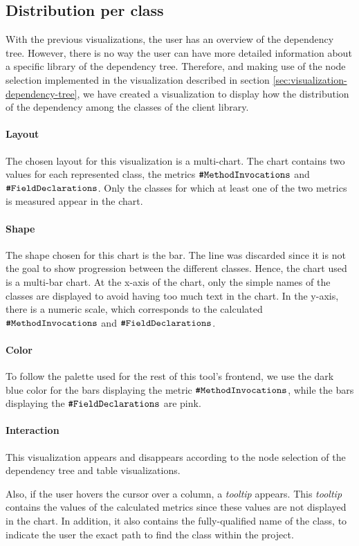 \subsection{Distribution per class}
With the previous visualizations, the user has an overview of the dependency tree. However, there is no way the user can have more detailed information about a specific library of the dependency tree. Therefore, and making use of the node selection implemented in the visualization described in section \ref{sec:visualization-dependency-tree}, we have created a visualization to display how the distribution of the dependency among the classes of the client library.

\paragraph{Layout}
The chosen layout for this visualization is a multi-chart. The chart contains two values for each represented class, the metrics \(\verb|#MethodInvocations|\) and \(\verb|#FieldDeclarations|\).
Only the classes for which at least one of the two metrics is measured appear in the chart.

\paragraph{Shape}
The shape chosen for this chart is the bar. The line was discarded since it is not the goal to show progression between the different classes. Hence, the chart used is a multi-bar chart.
At the x-axis of the chart, only the simple names of the classes are displayed to avoid having too much text in the chart. In the y-axis, there is a numeric scale, which corresponds to the calculated \(\verb|#MethodInvocations|\) and \(\verb|#FieldDeclarations|\).

\paragraph{Color}
To follow the palette used for the rest of this tool's frontend, we use the dark blue color for the bars displaying the metric \(\verb|#MethodInvocations|\), while the bars displaying the \(\verb|#FieldDeclarations|\) are pink.

\paragraph{Interaction}
This visualization appears and disappears according to the node selection of the dependency tree and table visualizations.

Also, if the user hovers the cursor over a column, a \textit{tooltip} appears. This \textit{tooltip} contains the values of the calculated metrics since these values are not displayed in the chart. In addition, it also contains the fully-qualified name of the class, to indicate the user the exact path to find the class within the project.
